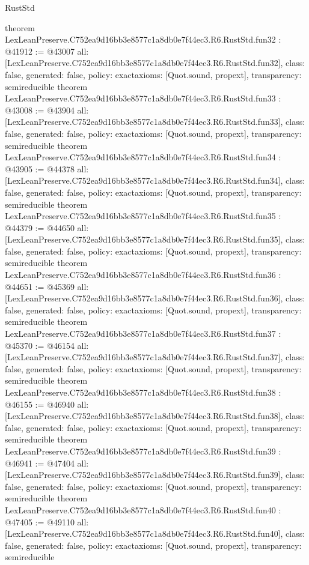 \begin{lexlean}{RustStd}
\begin{coremodule}
{}
theorem LexLeanPreserve.C752ea9d16bb3e8577c1a8db0e7f44ec3.R6.RustStd.fun32 : @41912 := @43007 {
  all: [LexLeanPreserve.C752ea9d16bb3e8577c1a8db0e7f44ec3.R6.RustStd.fun32],
  class: false,
  generated: false,
  policy: exact{axioms: [Quot.sound, propext]},
  transparency: semireducible
}
theorem LexLeanPreserve.C752ea9d16bb3e8577c1a8db0e7f44ec3.R6.RustStd.fun33 : @43008 := @43904 {
  all: [LexLeanPreserve.C752ea9d16bb3e8577c1a8db0e7f44ec3.R6.RustStd.fun33],
  class: false,
  generated: false,
  policy: exact{axioms: [Quot.sound, propext]},
  transparency: semireducible
}
theorem LexLeanPreserve.C752ea9d16bb3e8577c1a8db0e7f44ec3.R6.RustStd.fun34 : @43905 := @44378 {
  all: [LexLeanPreserve.C752ea9d16bb3e8577c1a8db0e7f44ec3.R6.RustStd.fun34],
  class: false,
  generated: false,
  policy: exact{axioms: [Quot.sound, propext]},
  transparency: semireducible
}
theorem LexLeanPreserve.C752ea9d16bb3e8577c1a8db0e7f44ec3.R6.RustStd.fun35 : @44379 := @44650 {
  all: [LexLeanPreserve.C752ea9d16bb3e8577c1a8db0e7f44ec3.R6.RustStd.fun35],
  class: false,
  generated: false,
  policy: exact{axioms: [Quot.sound, propext]},
  transparency: semireducible
}
theorem LexLeanPreserve.C752ea9d16bb3e8577c1a8db0e7f44ec3.R6.RustStd.fun36 : @44651 := @45369 {
  all: [LexLeanPreserve.C752ea9d16bb3e8577c1a8db0e7f44ec3.R6.RustStd.fun36],
  class: false,
  generated: false,
  policy: exact{axioms: [Quot.sound, propext]},
  transparency: semireducible
}
theorem LexLeanPreserve.C752ea9d16bb3e8577c1a8db0e7f44ec3.R6.RustStd.fun37 : @45370 := @46154 {
  all: [LexLeanPreserve.C752ea9d16bb3e8577c1a8db0e7f44ec3.R6.RustStd.fun37],
  class: false,
  generated: false,
  policy: exact{axioms: [Quot.sound, propext]},
  transparency: semireducible
}
theorem LexLeanPreserve.C752ea9d16bb3e8577c1a8db0e7f44ec3.R6.RustStd.fun38 : @46155 := @46940 {
  all: [LexLeanPreserve.C752ea9d16bb3e8577c1a8db0e7f44ec3.R6.RustStd.fun38],
  class: false,
  generated: false,
  policy: exact{axioms: [Quot.sound, propext]},
  transparency: semireducible
}
theorem LexLeanPreserve.C752ea9d16bb3e8577c1a8db0e7f44ec3.R6.RustStd.fun39 : @46941 := @47404 {
  all: [LexLeanPreserve.C752ea9d16bb3e8577c1a8db0e7f44ec3.R6.RustStd.fun39],
  class: false,
  generated: false,
  policy: exact{axioms: [Quot.sound, propext]},
  transparency: semireducible
}
theorem LexLeanPreserve.C752ea9d16bb3e8577c1a8db0e7f44ec3.R6.RustStd.fun40 : @47405 := @49110 {
  all: [LexLeanPreserve.C752ea9d16bb3e8577c1a8db0e7f44ec3.R6.RustStd.fun40],
  class: false,
  generated: false,
  policy: exact{axioms: [Quot.sound, propext]},
  transparency: semireducible
}
\end{coremodule}
\end{lexlean}

